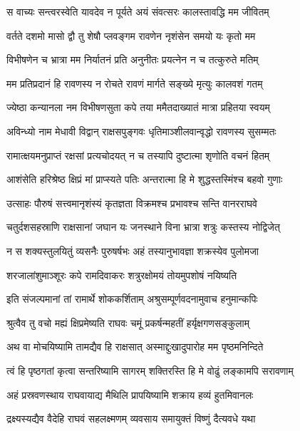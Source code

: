 \twolineshloka
{स वाच्यः सन्त्वरस्वेति यावदेव न पूर्यते}
{अयं संवत्सरः कालस्तावद्धि मम जीवितम्} %

\twolineshloka
{वर्तते दशमो मासो द्वौ तु शेषौ प्लवङ्गम}
{रावणेन नृशंसेन समयो यः कृतो मम} %

\twolineshloka
{विभीषणेन च भ्रात्रा मम निर्यातनं प्रति}
{अनुनीतः प्रयत्नेन न च तत्कुरुते मतिम्} %

\twolineshloka
{मम प्रतिप्रदानं हि रावणस्य न रोचते}
{रावणं मार्गते सङ्ख्ये मृत्युः कालवशं गतम्} %

\twolineshloka
{ज्येष्ठा कन्यानला नम विभीषणसुता कपे}
{तया ममैतदाख्यातं मात्रा प्रहितया स्वयम्} %

\twolineshloka
{अविन्ध्यो नाम मेधावी विद्वान् राक्षसपुङ्गवः}
{धृतिमाञ्शीलवान्वृद्धो रावणस्य सुसम्मतः} %

\twolineshloka
{रामात्क्षयमनुप्राप्तं रक्षसां प्रत्यचोदयत्}
{न च तस्यापि दुष्टात्मा शृणोति वचनं हितम्} %

\twolineshloka
{आशंसेति हरिश्रेष्ठ क्षिप्रं मां प्राप्स्यते पतिः}
{अन्तरात्मा हि मे शुद्धस्तस्मिंश्च बहवो गुणाः} %

\twolineshloka
{उत्साहः पौरुषं सत्त्वमानृशंस्यं कृतज्ञता}
{विक्रमश्च प्रभावश्च सन्ति वानरराघवे} %

\twolineshloka
{चतुर्दशसहस्राणि राक्षसानां जघान यः}
{जनस्थाने विना भ्रात्रा शत्रुः कस्तस्य नोद्विजेत्} %

\twolineshloka
{न स शक्यस्तुलयितुं व्यसनैः पुरुषर्षभः}
{अहं तस्यानुभावज्ञा शक्रस्येव पुलोमजा} %

\twolineshloka
{शरजालांशुमाञ्शूरः कपे रामदिवाकरः}
{शत्रुरक्षोमयं तोयमुपशोषं नयिष्यति} %

\twolineshloka
{इति संजल्पमानां तां रामार्थे शोककर्शिताम्}
{अश्रुसम्पूर्णवदनामुवाच हनुमान्कपिः} %

\twolineshloka
{श्रुत्वैव तु वचो मह्यं क्षिप्रमेष्यति राघवः}
{चमूं प्रकर्षन्महतीं हर्यृक्षगणसङ्कुलाम्} %

\twolineshloka
{अथ वा मोचयिष्यामि तामद्यैव हि राक्षसात्}
{अस्माद्दुःखादुपारोह मम पृष्ठमनिन्दिते} %

\twolineshloka
{त्वं हि पृष्ठगतां कृत्वा सन्तरिष्यामि सागरम्}
{शक्तिरस्ति हि मे वोढुं लङ्कामपि सरावणाम्} %

\twolineshloka
{अहं प्रस्रवणस्थाय राघवायाद्य मैथिलि}
{प्रापयिष्यामि शक्राय हव्यं हुतमिवानलः} %

\twolineshloka
{द्रक्ष्यस्यद्यैव वैदेहि राघवं सहलक्ष्मणम्}
{व्यवसाय समायुक्तं विष्णुं दैत्यवधे यथा} %

